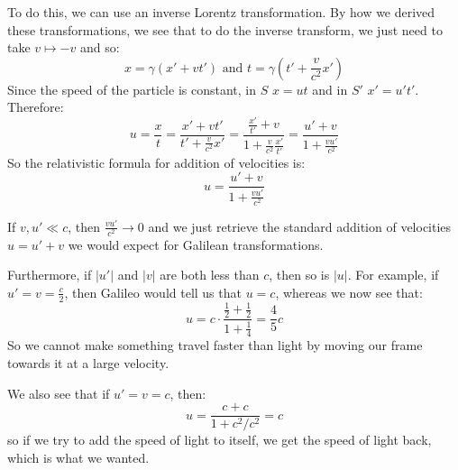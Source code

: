 \documentclass[../main.tex]{subfiles}
\begin{document}
To do this, we can use an inverse Lorentz transformation.
By how we derived these transformations, we see that to do the inverse transform, we just need to take $v \mapsto -v$ and so:
\[
  x = \gamma(x' + vt') \text{ and } t = \gamma\left(t' + \frac{v}{c^2}x'\right)
\]
Since the speed of the particle is constant, in $S$ $x = ut$ and in $S'$ $x' = u't'$.
Therefore:
\[
  u = \frac{x}{t} = \frac{x' + vt'}{t' + \frac{v}{c^2}x'} = \frac{\frac{x'}{t'} + v}{1 + \frac{v}{c^2}\frac{x'}{t'}} = \frac{u' + v}{1 + \frac{vu'}{c^2}}
\]
So the relativistic formula for addition of velocities is:
\[
  u = \frac{u' + v}{1 + \frac{vu'}{c^2}}
\]
\begin{remark}
  If $v, u' \ll c$, then $\frac{vu'}{c^2} \to 0$ and we just retrieve the standard addition of velocities $u = u' + v$ we would expect for Galilean transformations.
\end{remark}
Furthermore, if $|u'|$ and $|v|$ are both less than $c$, then so is $|u|$.
For example, if $u' = v = \frac{c}{2}$, then Galileo would tell us that $u = c$, whereas we now see that:
\[
  u = c \cdot \frac{\frac{1}{2} + \frac{1}{2}}{1 + \frac{1}{4}} = \frac{4}{5}c
\]
So we cannot make something travel faster than light by moving our frame towards it at a large velocity.

We also see that if $u' = v = c$, then:
\[
  u = \frac{c + c}{1 + c^2/c^2} = c
\]
so if we try to add the speed of light to itself, we get the speed of light back, which is what we wanted.
\end{document}
